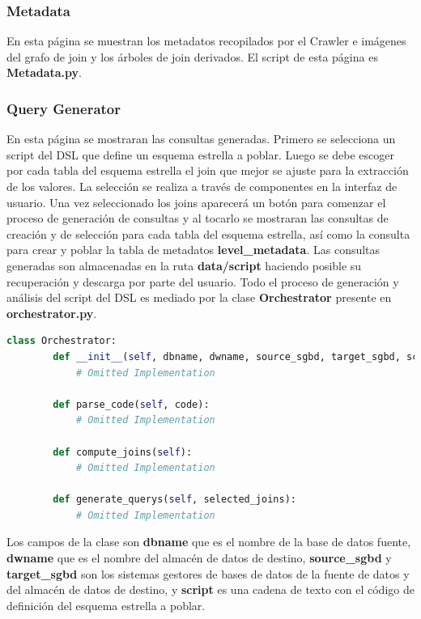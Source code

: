 \subsubsection{Metadata}

En esta página se muestran los metadatos recopilados por el Crawler e imágenes del 
grafo de join y los \'arboles de join derivados. El script de esta página es \textbf{Metadata.py}.

\subsubsection{Query Generator}

En esta página se mostraran las consultas generadas. Primero se selecciona un script del DSL que 
define un esquema estrella a poblar. Luego se debe escoger por cada tabla del esquema estrella el 
join que mejor se ajuste para la extracción de los valores. La selección se realiza a través 
de componentes en la interfaz de usuario. Una vez seleccionado los joins aparecer\'a un bot\'on 
para comenzar el proceso de generación de consultas y al tocarlo se mostraran las consultas 
de creación y de selección para cada tabla del esquema estrella, as\'i como la consulta 
para crear y poblar la tabla de metadatos \textbf{level\_metadata}. Las consultas generadas 
son almacenadas en la ruta \textbf{data/script} haciendo posible su recuperación y descarga por parte del usuario. 
Todo el proceso de generación y análisis del script del DSL es mediado por la clase \textbf{Orchestrator} 
presente en \textbf{orchestrator.py}. 

\begin{lstlisting}[label={code:orchestrator}, caption={Clase Orchestrator}, language={python}]
    class Orchestrator:
        def __init__(self, dbname, dwname, source_sgbd, target_sgbd, script) -> None:
            # Omitted Implementation

        def parse_code(self, code):
            # Omitted Implementation

        def compute_joins(self):
            # Omitted Implementation

        def generate_querys(self, selected_joins):
            # Omitted Implementation
\end{lstlisting}

Los campos de la clase son \textbf{dbname} que es el nombre de la base de datos fuente, 
\textbf{dwname} que es el nombre del almacén de datos de destino, \textbf{source\_sgbd} y 
\textbf{target\_sgbd} son los sistemas gestores de bases de datos de la fuente de datos y 
del almacén de datos de destino, y \textbf{script} es una cadena de texto con el código 
de definición del esquema estrella a poblar.

